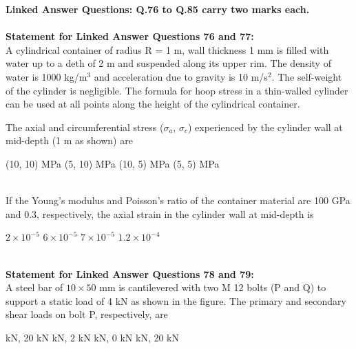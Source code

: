 \documentclass[addpoints,11pt]{exam}
\begin{document}
\begin{questions}
\large\textbf{Linked Answer Questions: Q.76 to Q.85 carry two marks each.}\\\\
\normalsize\textbf{Statement for Linked Answer Questions 76 and 77:}\\

A cylindrical container of radius R = 1 m, wall thickness 1 mm is filled with water up to a deth of 2 m and suspended along its upper rim. The density of water is 1000 kg/m$^3$ and acceleration due to gravity is 10 m/s$^2$. The self-weight of the cylinder is negligible. The formula for hoop stress in a thin-walled cylinder can be used at all points along the height of the cylindrical container.%

    \question The axial and circumferential stress ($\sigma_a$, $\sigma_c$) experienced by the cylinder wall at mid-depth (1 m as shown) are\\

    \begin{oneparchoices}
        \choice (10, 10) MPa
        \choice (5, 10) MPa
        \choice (10, 5) MPa
        \choice (5, 5) MPa
    \end{oneparchoices}\\

    \question If the Young's modulus and Poisson's ratio of the container material are 100 GPa and 0.3, respectively, the axial strain in the cylinder wall at mid-depth is\\

    \begin{oneparchoices}
        \choice $2\times10^{-5}$
        \choice $6\times10^{-5}$
        \choice $7\times10^{-5}$
        \choice $1.2\times10^{-4}$
    \end{oneparchoices}\\

\normalsize\textbf{Statement for Linked Answer Questions 78 and 79:}\\
A steel bar of $10\times50$ mm is cantilevered with two M 12 bolts (P and Q) to support a static load of 4 kN as shown in the figure.%
    \question The primary and secondary shear loads on bolt P, respectively, are\\

    \begin{oneparchoices}
         kN, 20 kN
         kN, 2 kN
         kN, 0 kN
         kN, 20 kN
    \end{oneparchoices}\\


\end{questions}
\end{document}
